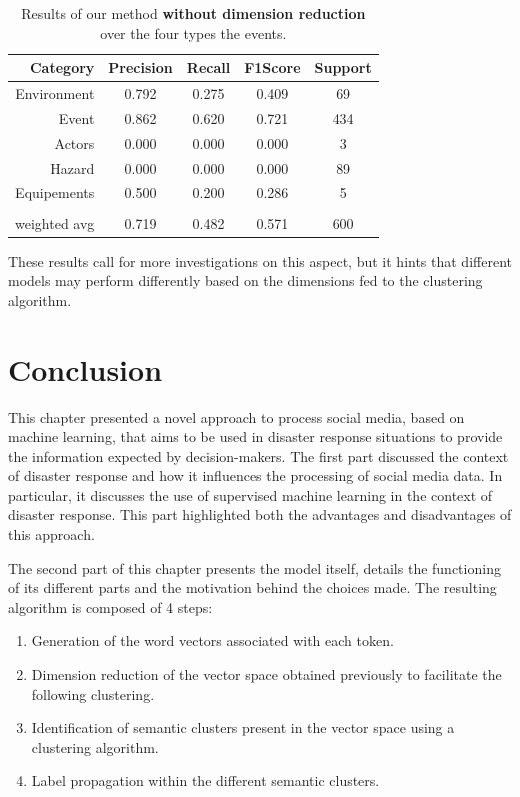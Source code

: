 \begin{table}[htb]
    \centering
    \caption{Results of our method \textbf{without dimension reduction} over the four types the events.}
    \begin{tabular}{rcccc}
        Category     & Precision & \textbf{Recall} & F1\-Score & Support \\
        \toprule
        Environment  & 0.792     & 0.275           & 0.409     & 69      \\
        Event        & 0.862     & 0.620           & 0.721     & 434     \\
        Actors       & 0.000     & 0.000           & 0.000     & 3       \\
        Hazard       & 0.000     & 0.000           & 0.000     & 89      \\
        Equipements  & 0.500     & 0.200           & 0.286     & 5       \\
                     &           &                 &           &         \\
        weighted avg & 0.719     & 0.482           & 0.571     & 600     \\
        \bottomrule
    \end{tabular}
    \label{table:overall-results-nodim}
\end{table}

These results call for more investigations on this aspect, but it hints that different models may perform differently based on the dimensions fed to the clustering algorithm.

\section*{Conclusion}
This chapter presented a novel approach to process social media, based on machine learning, that aims to be used in disaster response situations to provide the information expected by decision-makers.
The first part discussed the context of disaster response and how it influences the processing of social media data.
In particular, it discusses the use of supervised machine learning in the context of disaster response.
This part highlighted both the advantages and disadvantages of this approach.

The second part of this chapter presents the model itself, details the functioning of its different parts and the motivation behind the choices made.
The resulting algorithm is composed of 4 steps:

\begin{enumerate}
    \item Generation of the word vectors associated with each token.
    \item Dimension reduction of the vector space obtained previously to facilitate the following clustering.
    \item Identification of semantic clusters present in the vector space using a clustering algorithm.
    \item Label propagation within the different semantic clusters.
\end{enumerate}

